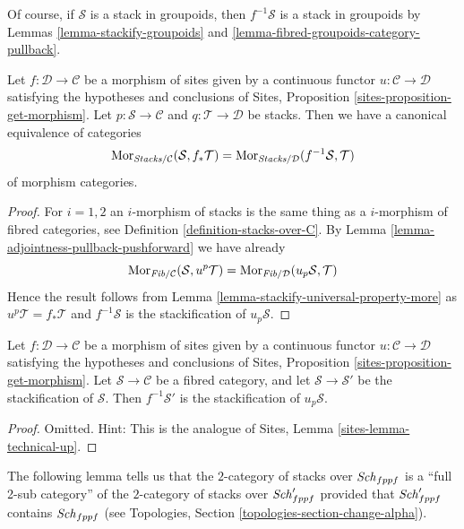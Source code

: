 \noindent
Of course, if $\mathcal{S}$ is a stack in groupoids, then $f^{-1}\mathcal{S}$
is a stack in groupoids by
Lemmas \ref{lemma-stackify-groupoids} and
\ref{lemma-fibred-groupoids-category-pullback}.

\begin{lemma}
\label{lemma-adjointness-pullback-pushforward-stacks}
Let $f : \mathcal{D} \to \mathcal{C}$ be a morphism of sites
given by a continuous functor $u : \mathcal{C} \to \mathcal{D}$
satisfying the hypotheses and conclusions of
Sites, Proposition \ref{sites-proposition-get-morphism}.
Let $p : \mathcal{S} \to \mathcal{C}$ and
$q : \mathcal{T} \to \mathcal{D}$ be stacks.
Then we have a canonical equivalence of categories
$$
\mathop{\mathrm{Mor}}\nolimits_{\textit{Stacks}/\mathcal{C}}(\mathcal{S}, f_*\mathcal{T})
=
\mathop{\mathrm{Mor}}\nolimits_{\textit{Stacks}/\mathcal{D}}(f^{-1}\mathcal{S}, \mathcal{T})
$$
of morphism categories.
\end{lemma}

\begin{proof}
For $i = 1, 2$ an $i$-morphism of stacks is the same thing as a
$i$-morphism of fibred categories, see
Definition \ref{definition-stacks-over-C}.
By
Lemma \ref{lemma-adjointness-pullback-pushforward}
we have already
$$
\mathop{\mathrm{Mor}}\nolimits_{\textit{Fib}/\mathcal{C}}(\mathcal{S}, u^p\mathcal{T})
=
\mathop{\mathrm{Mor}}\nolimits_{\textit{Fib}/\mathcal{D}}(u_p\mathcal{S}, \mathcal{T})
$$
Hence the result follows from
Lemma \ref{lemma-stackify-universal-property-more}
as $u^p\mathcal{T} = f_*\mathcal{T}$ and $f^{-1}\mathcal{S}$ is the
stackification of $u_p\mathcal{S}$.
\end{proof}

\begin{lemma}
\label{lemma-technical-up}
Let $f : \mathcal{D} \to \mathcal{C}$ be a morphism of sites
given by a continuous functor $u : \mathcal{C} \to \mathcal{D}$
satisfying the hypotheses and conclusions of
Sites, Proposition \ref{sites-proposition-get-morphism}.
Let $\mathcal{S} \to \mathcal{C}$ be a fibred category, and
let $\mathcal{S} \to \mathcal{S}'$ be the stackification of $\mathcal{S}$.
Then $f^{-1}\mathcal{S}'$ is the stackification of
$u_p\mathcal{S}$.
\end{lemma}

\begin{proof}
Omitted. Hint:
This is the analogue of Sites, Lemma \ref{sites-lemma-technical-up}.
\end{proof}

\noindent
The following lemma tells us that the $2$-category of stacks
over $\mathit{Sch}_{fppf}$ is a ``full 2-sub category'' of the
$2$-category of stacks over $\mathit{Sch}'_{fppf}$ provided that
$\mathit{Sch}'_{fppf}$ contains $\mathit{Sch}_{fppf}$ (see
Topologies, Section \ref{topologies-section-change-alpha}).

